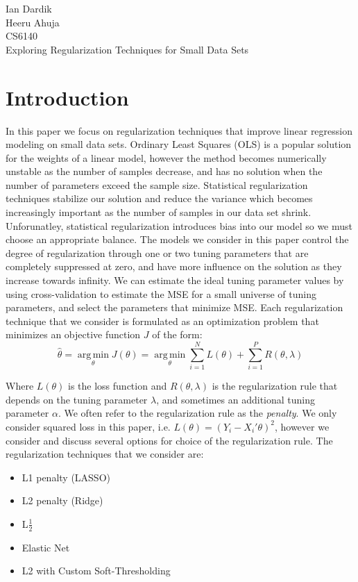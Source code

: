 \documentclass[11pt]{article}
\newcommand{\thh}{\hat{\theta}}
\DeclareMathOperator*{\argmin}{arg\,min}
\begin{document}
Ian Dardik \\
Heeru Ahuja \\
CS6140 \\
Exploring Regularization Techniques for Small Data Sets

\section{Introduction}
In this paper we focus on regularization techniques that improve linear regression modeling on small data sets.  Ordinary Least Squares (OLS) is a popular solution for the weights of a linear model, however the method becomes numerically unstable as the number of samples decrease, and has no solution when the number of parameters exceed the sample size.  Statistical regularization techniques stabilize our solution and reduce the variance which becomes increasingly important as the number of samples in our data set shrink.  Unforunatley, statistical regularization introduces bias into our model so we must choose an appropriate balance.  The models we consider in this paper control the degree of regularization through one or two tuning parameters that are completely suppressed at zero, and have more influence on the solution as they increase towards infinity.  We can estimate the ideal tuning parameter values by using cross-validation to estimate the MSE for a small universe of tuning parameters, and select the parameters that minimize MSE.  Each regularization technique that we consider is formulated as an optimization problem that minimizes an objective function $J$ of the form:
	$$\thh = \argmin\limits_\theta J(\theta) =\argmin\limits_\theta \sum\limits_{i=1}^N L(\theta) + \sum\limits_{i=1}^P R(\theta,\lambda)$$

Where $L(\theta)$ is the loss function and $R(\theta,\lambda)$ is the regularization rule that depends on the tuning parameter $\lambda$, and sometimes an additional tuning parameter $\alpha$.  We often refer to the regularization rule as the \textit{penalty}.  We only consider squared loss in this paper, i.e. $L(\theta)= (Y_i - X_i'\theta)^2$, however we consider and discuss several options for choice of the regularization rule.  The regularization techniques that we consider are:
\begin{itemize}
	\item L1 penalty (LASSO)
	\item L2 penalty (Ridge)
	\item L$\frac{1}{2}$
	\item Elastic Net
	\item L2 with Custom Soft-Thresholding
\end{itemize}
\end{document}
